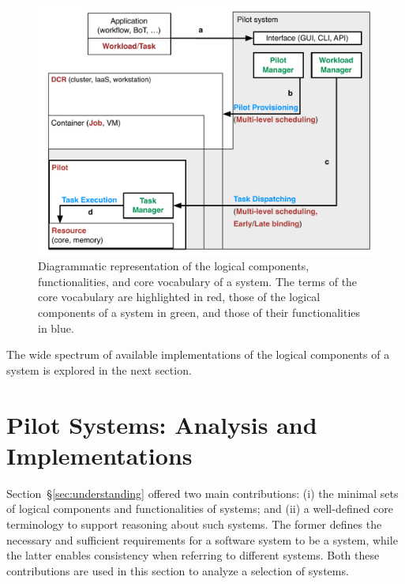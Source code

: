 \documentclass{sig-alternate}
\begin{document}
\begin{figure}[t]
    \centering
        \includegraphics[width=.48\textwidth]{figures/core_vocabulary.pdf}
    \caption{Diagrammatic representation of the logical components,
    functionalities, and core vocabulary of a \pilot system. The terms of the
    core vocabulary are highlighted in red, those of the logical components of a
    \pilot system in green, and those of their functionalities in blue.}
    \label{fig:core_vocabulary}
\end{figure}


The wide spectrum of available implementations of the logical components of a
\pilot system is explored in the next section.



\section{Pilot Systems: Analysis and Implementations}
\label{sec:analysis}

Section~\S\ref{sec:understanding} offered two main contributions: (i) the
minimal sets of logical components and functionalities of \pilot systems; and
(ii) a well-defined core terminology to support reasoning about such systems.
The former defines the necessary and sufficient requirements for a software
system to be a \pilot system, while the latter enables consistency when
referring to different \pilot systems. Both these contributions are used in this
section to analyze a selection of \pilot systems.
\end{document}
